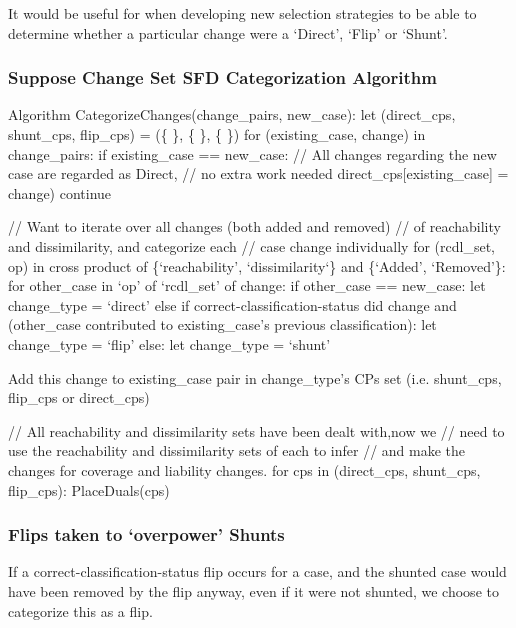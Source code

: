 \documentclass[a4paper,11pt]{report}
\begin{document}
It would be useful for when developing new selection strategies to be able to determine whether a particular change were a `Direct', `Flip' or `Shunt'.

\subsubsection{Suppose Change Set SFD Categorization Algorithm}
\begin{code}
Algorithm CategorizeChanges(change_pairs, new_case):
  let (direct_cps, shunt_cps, flip_cps) = (\{ \}, \{ \}, \{ \})
  for (existing_case, change) in change_pairs:
    if existing_case == new_case:
      // All changes regarding the new case are regarded as Direct, 
      // no extra work needed
      direct_cps[existing_case] = change)
      continue

    // Want to iterate over all changes (both added and removed) 
    // of reachability and dissimilarity, and categorize each 
    // case change individually
    for (rcdl_set, op) in cross product of 
                          \{`reachability', `dissimilarity`\} 
                      and \{`Added', `Removed'\}:
      for other_case in `op' of `rcdl_set' of change:
        if other_case == new_case:
          let change_type = `direct'
        else if correct-classification-status did change 
             and (other_case contributed to existing_case's
                      previous classification):
          let change_type = `flip'
        else:
          let change_type = `shunt'
          
        Add this change to existing_case pair in change_type's CPs set 
            (i.e. shunt_cps, flip_cps or direct_cps)
    
  // All reachability and dissimilarity sets have been dealt with,now we
  // need to use the reachability and dissimilarity sets of each to infer
  // and make the changes for coverage and liability changes.
  for cps in (direct_cps, shunt_cps, flip_cps):
    PlaceDuals(cps)
\end{code}

\subsubsection{Flips taken to `overpower' Shunts}
If a correct-classification-status flip occurs for a case, and the shunted case would have been removed by the flip anyway, even if it were not shunted, we choose to categorize this as a flip. 
\end{document}
